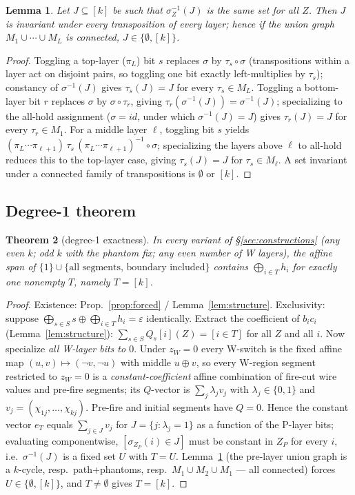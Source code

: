 \documentclass[11pt]{article}
\newtheorem{theorem}{Theorem}
\newtheorem{lemma}[theorem]{Lemma}
\theoremstyle{remark}
\begin{document}
\begin{lemma}\label{lem:invariant}
Let $J\subseteq[k]$ be such that $\sigma_Z^{-1}(J)$ is the same set for all $Z$. Then $J$ is
invariant under every transposition of every layer; hence if the union graph
$M_1\cup\cdots\cup M_L$ is connected, $J\in\{\emptyset,[k]\}$.
\end{lemma}
\begin{proof}
Toggling a top-layer ($\pi_L$) bit $s$ replaces $\sigma$ by $\tau_s\circ\sigma$ (transpositions
within a layer act on disjoint pairs, so toggling one bit exactly left-multiplies by $\tau_s$);
constancy of $\sigma^{-1}(J)$ gives $\tau_s(J)=J$ for every $\tau_s\in M_L$. Toggling a
bottom-layer bit $r$ replaces $\sigma$ by $\sigma\circ\tau_r$, giving
$\tau_r(\sigma^{-1}(J))=\sigma^{-1}(J)$; specializing to the all-hold assignment ($\sigma=id$,
under which $\sigma^{-1}(J)=J$) gives $\tau_r(J)=J$ for every $\tau_r\in M_1$. For a middle
layer $\ell$, toggling bit $s$ yields
$(\pi_L\cdots\pi_{\ell+1})\,\tau_s\,(\pi_L\cdots\pi_{\ell+1})^{-1}\circ\sigma$; specializing the
layers above $\ell$ to all-hold reduces this to the top-layer case, giving $\tau_s(J)=J$ for
$\tau_s\in M_\ell$. A set invariant under a connected family of transpositions is $\emptyset$ or
$[k]$.
\end{proof}

\subsection{Degree-1 theorem}

\begin{theorem}[degree-1 exactness]\label{thm:deg1}
In every variant of \S\ref{sec:constructions} (any even $k$; odd $k$ with the phantom fix; any
even number of W layers), the affine span of $\{1\}\cup\{\text{all segments, boundary
included}\}$ contains $\bigoplus_{i\in T}h_i$ for exactly one nonempty $T$, namely $T=[k]$.
\end{theorem}
\begin{proof}
Existence: Prop.~\ref{prop:forced} / Lemma~\ref{lem:structure}. Exclusivity: suppose
$\bigoplus_{s\in S}s\oplus\bigoplus_{i\in T}h_i=\varepsilon$ identically. Extract the
coefficient of $b_ic_i$ (Lemma~\ref{lem:structure}):
$\sum_{s\in S}Q_s[i](Z)=[i\in T]$ for all $Z$ and all $i$. Now specialize \emph{all W-layer bits
to $0$}. Under $z_W=0$ every W-switch is the fixed affine map $(u,v)\mapsto(\neg v,\neg u)$ with
middle $u\oplus v$, so every W-region segment restricted to $z_W=0$ is a
\emph{constant-coefficient} affine combination of fire-cut wire values and pre-fire segments;
its $Q$-vector is $\sum_j\lambda_j v_j$ with $\lambda_j\in\{0,1\}$ and
$v_j=(\chi_{1j},\dots,\chi_{kj})$. Pre-fire and initial segments have $Q=0$. Hence the constant
vector $e_T$ equals $\sum_{j\in J}v_j$ for $J=\{j:\lambda_j=1\}$ as a function of the P-layer
bits; evaluating componentwise, $[\sigma_{Z_P}(i)\in J]$ must be constant in $Z_P$ for every
$i$, i.e.\ $\sigma^{-1}(J)$ is a fixed set $U$ with $T=U$. Lemma~\ref{lem:invariant} (the
pre-layer union graph is a $k$-cycle, resp.\ path+phantoms, resp.\ $M_1\cup M_2\cup M_1$ --- all
connected) forces $U\in\{\emptyset,[k]\}$, and $T\neq\emptyset$ gives $T=[k]$.
\end{proof}
\end{document}
